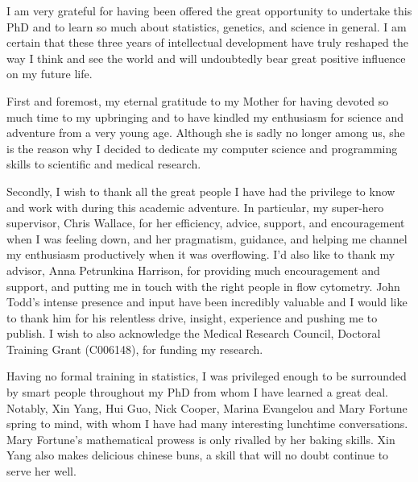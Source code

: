 
\begin{acknowledgements}      


 I am very grateful for having been offered the great opportunity to undertake this PhD and to learn so much about statistics, genetics, and science in general.
 I am certain that these three years of intellectual development have truly reshaped the way I think and see the world and will undoubtedly bear great positive influence on my future life.

 First and foremost, my eternal gratitude to my Mother for having devoted so much time to my upbringing and to have kindled my enthusiasm for science and adventure from a very young age.
 Although she is sadly no longer among us, she is the reason why I decided to dedicate my computer science and programming skills to scientific and medical research.

 Secondly, I wish to thank all the great people I have had the privilege to know and work with during this academic adventure.
 In particular, my super-hero supervisor, Chris Wallace, for her efficiency, advice, support, and encouragement when I was feeling down, and her pragmatism, guidance, and helping me channel my enthusiasm productively when it was overflowing.
 I'd also like to thank my advisor, Anna Petrunkina Harrison, for providing much encouragement and support, and putting me in touch with the right people in flow cytometry.
 John Todd's intense presence and input have been incredibly valuable and I would like to thank him for his relentless drive, insight, experience and pushing me to publish.
 I wish to also acknowledge the Medical Research Council, Doctoral Training Grant (C006148), for funding my research.

 Having no formal training in statistics, I was privileged enough to be surrounded by smart people throughout my PhD from whom I have learned a great deal.
 Notably, Xin Yang, Hui Guo, Nick Cooper, Marina Evangelou and Mary Fortune spring to mind, with whom I have had many interesting lunchtime conversations.
 Mary Fortune's  mathematical prowess is only rivalled by her baking skills.
 Xin Yang also makes delicious chinese buns, a skill that will no doubt continue to serve her well.


\end{acknowledgements}
